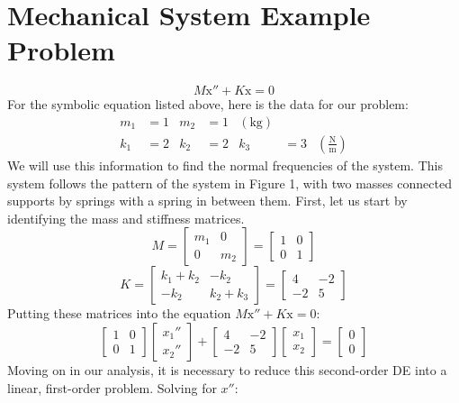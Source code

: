 \documentclass{article}
\begin{document}
\section{Mechanical System Example Problem}
$$ M\text{x}'' + K\text{x} = 0 $$
For the symbolic equation listed above, here is the data for our problem:
\begin{align*}
m_1 &= 1 & m_2 &= 1 & (\text{kg}) \\
k_1 &= 2 & k_2 &= 2 & k_3 &= 3 & \left(\frac{\text{N}}{\text{m}}\right)
\end{align*}
We will use this information to find the normal frequencies of the system. This system follows the pattern of the system 
in Figure 1, with two masses connected supports by springs with a spring in between them. First, let us start by identifying 
the mass and stiffness matrices.
\[
M = \begin{bmatrix} 
    m_1 & 0 \\
    0 & m_2
\end{bmatrix} = 
\begin{bmatrix}
    1 & 0 \\
    0 & 1 
\end{bmatrix}
\]
\[
K = \begin{bmatrix}
    k_1 + k_2 & -k_2 \\
    -k_2 & k_2 + k_3
\end{bmatrix} = 
\begin{bmatrix}
    4 & -2 \\
    -2 & 5
\end{bmatrix}
\]
Putting these matrices into the equation $ M\text{x}'' + K\text{x} = 0 $:
\[
\begin{bmatrix}
    1 & 0 \\
    0 & 1
\end{bmatrix}
\begin{bmatrix}
    x_1'' \\
    x_2''
\end{bmatrix}
+ \begin{bmatrix}
    4 & -2 \\
    -2 & 5
\end{bmatrix}
\begin{bmatrix}
    x_1 \\
    x_2
\end{bmatrix}
= \begin{bmatrix}
    0 \\
    0
\end{bmatrix}
\]
Moving on in our analysis, it is necessary to reduce this second-order DE into a linear, first-order problem. Solving for $x''$:
\end{document}
